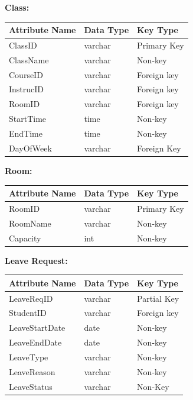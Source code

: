 \documentclass{article}
\begin{document}
\textbf{Class:}
\begin{table}[H]
\centering
\begin{large}
\begin{tabular}{|l|l|l|}
\hline
\textbf{Attribute Name} & \textbf{Data Type} & \textbf{Key Type} \\ \hline
ClassID & varchar & Primary Key \\ \hline
ClassName & varchar & Non-key\\ \hline
CourseID & varchar & Foreign key\\ \hline
InstrucID & varchar & Foreign key \\ \hline
RoomID & varchar & Foreign key\\ \hline
StartTime & time & Non-key\\ \hline
EndTime & time & Non-key\\  \hline
DayOfWeek & varchar & Foreign Key\\ \hline
\end{tabular}
\end{large}
\end{table}


\textbf{Room:}
\begin{table}[H]
\centering
\begin{large}
\begin{tabular}{|l|l|l|}
\hline
\textbf{Attribute Name} & \textbf{Data Type} & \textbf{Key Type} \\ \hline
RoomID & varchar & Primary Key \\ \hline
RoomName & varchar & Non-key\\ \hline
Capacity & int & Non-key\\ \hline
\end{tabular}
\end{large}
\end{table}

\newpage
\textbf{Leave Request:}
\begin{table}[H]
\centering
\begin{large}
\begin{tabular}{|l|l|l|}
\hline
\textbf{Attribute Name} & \textbf{Data Type} & \textbf{Key Type} \\ \hline
LeaveReqID & varchar & Partial Key \\ \hline
StudentID & varchar & Foreign key\\ \hline
LeaveStartDate & date & Non-key \\ \hline
LeaveEndDate & date & Non-key\\ \hline
LeaveType & varchar & Non-key\\ \hline
LeaveReason & varchar & Non-key\\ \hline
LeaveStatus & varchar & Non-Key\\ \hline
\end{tabular}
\end{large}
\end{table}
\end{document}
